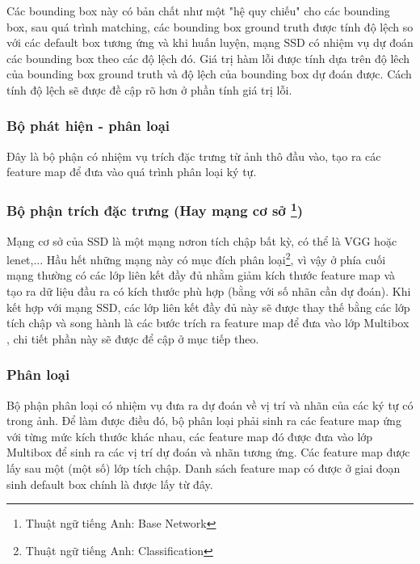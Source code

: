 \documentclass[a4paper,12pt]{article}
\begin{document}
	Các bounding box này có bản chất như một "hệ quy chiếu" cho các bounding box, sau quá trình matching, các bounding box ground truth được tính độ lệch so với các default box tương ứng và khi huấn luyện, mạng SSD\cite{liu2016ssd} có nhiệm vụ dự đoán các bounding box theo các độ lệch đó. Giá trị hàm lỗi được tính dựa trên độ lêch của bounding box ground truth và độ lệch của bounding box dự đoán được. Cách tính độ lệch sẽ được đề cập rõ hơn ở phần tính giá trị lỗi.
	
	
	\subsubsection{Bộ phát hiện - phân loại}
	Đây là bộ phận có nhiệm vụ trích đặc trưng từ ảnh thô đầu vào, tạo ra các feature map để đưa vào quá trình phân loại ký tự.
	
	\subsubsection*{Bộ phận trích đặc trưng (Hay mạng cơ sở \footnote{Thuật ngữ tiếng Anh: Base Network})}
	
	Mạng cơ sở của SSD\cite{liu2016ssd} là một mạng nơron tích chập bất kỳ, có thể là VGG\cite{Simonyan14c} hoặc lenet\cite{yanlecun},... Hầu hết những mạng này có mục đích phân loại\footnote{Thuật ngữ tiếng Anh: Classification}, vì vậy ở phía cuối mạng thường có các lớp liên kết đầy đủ nhằm giảm kích thước feature map và tạo ra dữ liệu đầu ra có kích thước phù hợp (bằng với số nhãn cần dự đoán). Khi kết hợp với mạng SSD\cite{liu2016ssd}, các lớp liên kết đầy đủ này sẽ được thay thế bằng các lớp tích chập và song hành là các bước trích ra feature map để đưa vào lớp Multibox \cite{erhan2014scalable}, chi tiết phần này sẽ được để cập ở mục tiếp theo.
	
	\subsubsection* {Phân loại}
	
	Bộ phận phân loại có nhiệm vụ đưa ra dự đoán về vị trí và nhãn của các ký tự có trong ảnh. Để làm được điều đó, bộ phân loại phải sinh ra các feature map ứng với từng mức kích thước khác nhau, các feature map đó được đưa vào lớp Multibox để sinh ra các vị trí dự đoán và nhãn tương ứng. Các feature map được lấy sau một (một số) lớp tích chập. Danh sách feature map có được ở giai đoạn sinh default box chính là được lấy từ đây. \\
	
\end{document}
